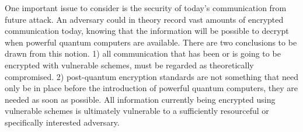 \documentclass[conference]{IEEEtran}
\begin{document}
One important issue to consider is the security of today's communication from future attack.
An adversary could in theory record vast amounts of encrypted communication today, knowing that the information will be possible to decrypt when powerful quantum computers are available.
There are two conclusions to be drawn from this notion.
1) all communication that has been or is going to be encrypted with vulnerable schemes, must be regarded as theoretically compromised.
2) post-quantum encryption standards are not something that need only be in place before the introduction of powerful quantum computers, they are needed as soon as possible.
All information currently being encrypted using vulnerable schemes is ultimately vulnerable to a sufficiently resourceful or specifically interested adversary.




\end{document}
